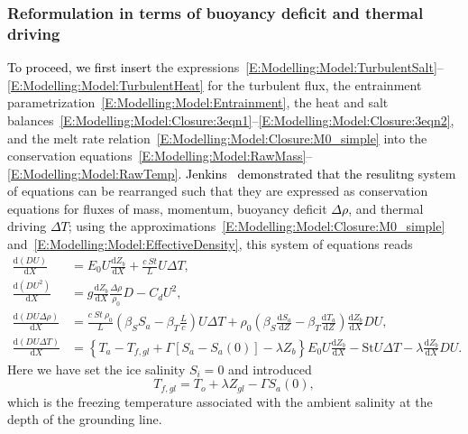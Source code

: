 \documentclass[openacc]{rsproca_new}%
\newcommand{\dd}[2]{\frac{\mathrm{d} #1}{\mathrm{d} #2}}
\newcommand{\red}[1]{{\color{red} #1}}
\newcommand{\blue}[1]{{\color{blue} #1}}
\newcommand{\rout}[1]{\red{\st{#1}}}\newcommand{\ab}[1]{\textcolor{Green}{#1}}\newcommand{\about}[1]{\textcolor{Cyan}{\sout{#1}}}
\renewcommand{\rout}[1]{{}} %
\renewcommand{\blue}[1]{{\textcolor{black}{#1}}} %
\renewcommand{\red}[1]{{}} %
\begin{document}
\subsubsection{Reformulation in terms of buoyancy deficit and thermal driving}
\blue{To proceed, we first insert}\rout{Inserting} the expressions~\eqref{E:Modelling:Model:TurbulentSalt}--\eqref{E:Modelling:Model:TurbulentHeat} for the turbulent flux, the entrainment parametrization~\eqref{E:Modelling:Model:Entrainment}, the heat and salt balances~\eqref{E:Modelling:Model:Closure:3eqn1}--\eqref{E:Modelling:Model:Closure:3eqn2}, and the melt rate relation~\eqref{E:Modelling:Model:Closure:M0_simple} into the conservation equations~\eqref{E:Modelling:Model:RawMass}--\eqref{E:Modelling:Model:RawTemp}\blue{. Jenkins~\cite{Jenkins2011JPhysOcean} demonstrated that the resulitng}\rout{gives a} system of equations \rout{that }can be rearranged such that they are expressed as conservation equations for fluxes of mass, momentum, buoyancy deficit \blue{$\Delta \rho$}, and thermal driving \blue{$\Delta T$}; using the approximations~\eqref{E:Modelling:Model:Closure:M0_simple} and~\eqref{E:Modelling:Model:EffectiveDensity}, this system of equations reads
\begin{align}
\dd{(DU)}{X} &= E_0 U \dd{Z_b}{X}+ \frac{c~\textit{St}}{L}U\Delta T,\label{E:Modelling:Model:Mass}\\
\dd{(DU^2)}{X} &= g \dd{Z_b}{X} \frac{\Delta \rho }{\rho_0} D - C_d U^2, \label{E:Modelling:Model:Mom}\\
\dd{(DU\Delta \rho)}{X} &= \frac{c~\textit{St}~\rho_0}{L}\left(\beta_S S_a - \beta_T \frac{L}{c}\right) U\Delta T + \rho_0\left(\beta_S \dd{S_a}{Z}-\beta_T \dd{T_a}{Z}\right) \dd{Z_b}{X} DU, \label{E:Modelling:Model:Buoyancy}\\
\dd{(DU\Delta T)}{X} &= \left\{T_a - T_{f,gl} + \Gamma \left[S_a - S_a(0)\right] - \lambda Z_b\right\}E_0 U \dd{Z_b}{X} - \mathrm{St}U \Delta T - \lambda \dd{Z_b}{X} DU.
\label{E:Modelling:Model:Thermal}
\end{align}
Here we have set the ice salinity $S_i = 0$ and introduced
\begin{equation}
T_{f,gl} = T_o + \lambda Z_{gl} - \Gamma S_a(0),
\end{equation}
which is the freezing temperature associated with the ambient salinity at the depth of the grounding line.
\end{document}
